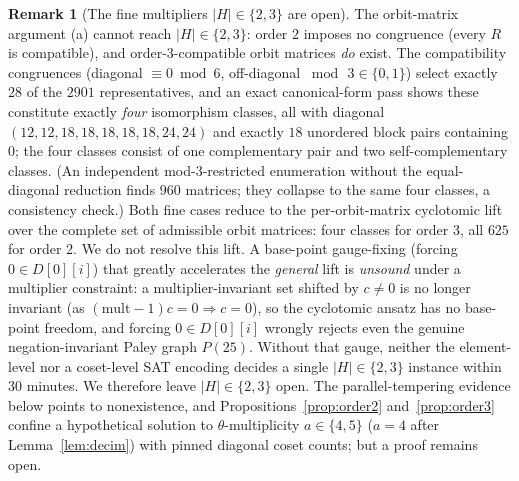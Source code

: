 \documentclass[11pt]{article}
\theoremstyle{definition}
\newtheorem{remark}{Remark}
\begin{document}
\begin{remark}[The fine multipliers $|H|\in\{2,3\}$ are open]\label{rem:open}
The orbit-matrix argument (a) cannot reach $|H|\in\{2,3\}$: order $2$ imposes no congruence (every $R$ is
compatible), and order-$3$-compatible orbit matrices \emph{do} exist. The compatibility congruences
(diagonal $\equiv0\bmod 6$, off-diagonal $\bmod\,3\in\{0,1\}$) select exactly $28$ of the $2901$
representatives, and an exact canonical-form pass shows these constitute exactly \emph{four} isomorphism
classes, all with diagonal $(12,12,18,18,18,18,18,24,24)$ and exactly $18$ unordered block pairs containing
$0$; the four classes consist of one complementary pair and two self-complementary classes. (An independent
mod-$3$-restricted enumeration without the equal-diagonal reduction finds $960$ matrices; they collapse to
the same four classes, a consistency check.) Both fine cases reduce to the per-orbit-matrix cyclotomic lift
over the complete set of admissible orbit matrices: four classes for order $3$, all $625$ for order $2$. We do not
resolve this lift. A base-point gauge-fixing (forcing $0\in D[0][i]$) that greatly accelerates the
\emph{general} lift is \emph{unsound} under a multiplier constraint: a multiplier-invariant set shifted by
$c\neq0$ is no longer invariant (as $(\mathrm{mult}-1)c=0\Rightarrow c=0$), so the cyclotomic ansatz has no
base-point freedom, and forcing $0\in D[0][i]$ wrongly rejects even the genuine negation-invariant Paley
graph $P(25)$. Without that gauge, neither the element-level nor a coset-level SAT encoding decides a single
$|H|\in\{2,3\}$ instance within $30$ minutes. We therefore leave $|H|\in\{2,3\}$ open. The parallel-tempering
evidence below points to nonexistence, and Propositions~\ref{prop:order2} and~\ref{prop:order3} confine a
hypothetical solution to $\theta$-multiplicity $a\in\{4,5\}$ ($a=4$ after Lemma~\ref{lem:decim}) with
pinned diagonal coset counts; but a proof remains open.


\end{remark}
\end{document}
